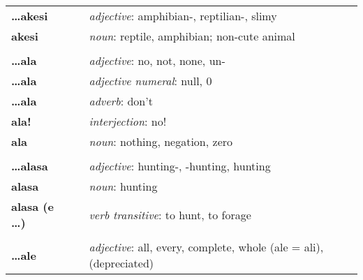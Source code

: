 \begin{supertabular}{p{2,5cm}|ll}
    \textbf{\dots akesi}         &  & \textit{adjective}: amphibian-, reptilian-, slimy                                                          \\
    \textbf{akesi}               &  & \textit{noun}: reptile, amphibian; non-cute animal                                                         \\
                                 &  &                                                                                                            \\ %
    \textbf{\dots ala}           &  & \textit{adjective}: no, not, none, un-                                                                     \\
    \textbf{\dots ala}           &  & \textit{adjective numeral}: null, 0                                                                        \\
    \textbf{\dots ala}           &  & \textit{adverb}: don't                                                                                     \\
    \textbf{ala!}                &  & \textit{interjection}: no!                                                                                 \\
    \textbf{ala}                 &  & \textit{noun}: nothing, negation, zero                                                                     \\
                                 &  &                                                                                                            \\ %
    \textbf{\dots alasa}         &  & \textit{adjective}: hunting-, -hunting, hunting                                                            \\
    \textbf{alasa}               &  & \textit{noun}: hunting                                                                                     \\
    \textbf{alasa (e \dots)}     &  & \textit{verb transitive}: to hunt, to forage                                                               \\
                                 &  &                                                                                                            \\ %
    \textbf{\dots ale}           &  & \textit{adjective}: all, every, complete, whole (ale = ali), (depreciated)                                 \\

\end{supertabular}
